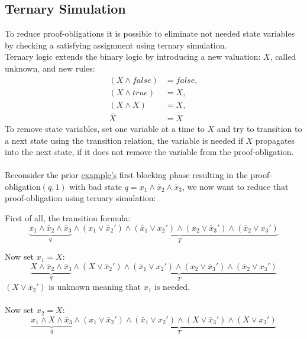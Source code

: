 \documentclass[11pt, a4paper, BCOR=10mm, ngerman, oneside]{scrbook}
\begin{document}
\subsection{Ternary Simulation}
To reduce proof-obligations it is possible to eliminate not needed state variables by checking a satisfying assignment using ternary simulation. \\
Ternary logic extends the binary logic by introducing a new valuation: $X$, called unknown, and new rules:
\begin{align*}
(X \land false) &= false, \\ (X \land true) &= X, \\ (X \land X) &= X, \\ \bar X &= X
\end{align*}
To remove state variables, set one variable at a time to $X$ and try to transition to a next state using the transition relation, the variable is needed if $X$ propagates into the next state, if it does not remove the variable from the proof-obligation. \\ \\
Reconsider the prior \hyperref[ex2]{example's} first blocking phase resulting in the proof-obligation$(q, 1)$ with bad state $q = x_1 \land \bar x_2 \land \bar x_3$, we now want to reduce that proof-obligation using ternary simulation: \par


First of all, the transition formula:
\begin{equation*}
\underbrace{x_1 \land \bar x_2 \land \bar x_3}_{q} \land \underbrace{(x_1 \lor \bar x_2' ) \land ( \bar x_1 \lor x_2') \land (x_2 \lor \bar x_3') \land ( \bar x_2 \lor x_3')}_{T}
\end{equation*}

Now set $x_1 = X$: \\
\begin{equation*}
\underbrace{X \land \bar x_2 \land \bar x_3}_{q} \land \underbrace{(X \lor \bar x_2' ) \land ( \bar x_1 \lor x_2') \land (x_2 \lor \bar x_3') \land ( \bar x_2 \lor x_3')}_{T}
\end{equation*}
$(X \lor \bar x_2')$ is unknown meaning that $x_1$  is needed. \\ \\

Now set $x_2 = X$: \\
\begin{equation*}
\underbrace{x_1 \land X \land \bar x_3}_{q} \land \underbrace{(x_1 \lor \bar x_2' ) \land ( \bar x_1 \lor x_2') \land (X \lor \bar x_3') \land ( X \lor x_3')}_{T}
\end{equation*}
\end{document}
